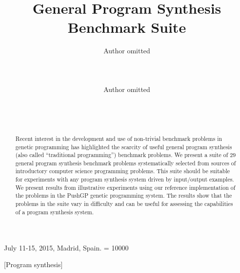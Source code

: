 \documentclass{sig-alternate}
\begin{document}
%
 {July 11-15, 2015, Madrid, Spain.}
\widowpenalty = 10000

\title{General Program Synthesis Benchmark Suite}


\author{
\alignauthor
Author omitted\\
       \\
       \\
       \\
\alignauthor
Author omitted\\
       \\
       \\
       \\
}

\maketitle

\begin{abstract}
Recent interest in the development and use of non-trivial benchmark problems in genetic programming has highlighted the scarcity of useful general program synthesis (also called ``traditional programming'') benchmark problems. We present a suite of $29$ general program synthesis benchmark problems systematically selected from sources of introductory computer science programming problems. This suite should be suitable for experiments with any program synthesis system driven by input/output examples. We present results from illustrative experiments using our reference implementation of the problems in the PushGP genetic programming system. The results show that the problems in the suite vary in difficulty and can be useful for assessing the capabilities of a program synthesis system.
\end{abstract}

[Program synthesis]

\end{document}
